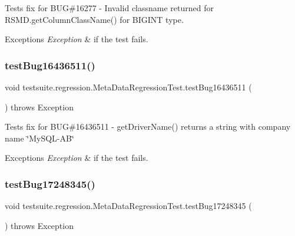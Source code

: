Tests fix for B\+UG\#16277 -\/ Invalid classname returned for R\+S\+M\+D.\+get\+Column\+Class\+Name() for B\+I\+G\+I\+NT type.


\begin{DoxyExceptions}{Exceptions}
{\em Exception} & if the test fails. \\
\hline
\end{DoxyExceptions}
\mbox{\label{classtestsuite_1_1regression_1_1_meta_data_regression_test_a1fd3d694ae818586b9e77cceb5bfbbb3}} 
\subsubsection{\texorpdfstring{test\+Bug16436511()}{testBug16436511()}}
{\footnotesize\ttfamily void testsuite.\+regression.\+Meta\+Data\+Regression\+Test.\+test\+Bug16436511 (\begin{DoxyParamCaption}{ }\end{DoxyParamCaption}) throws Exception}

Tests fix for B\+UG\#16436511 -\/ get\+Driver\+Name() returns a string with company name \char`\"{}\+My\+S\+Q\+L-\/\+A\+B\char`\"{}


\begin{DoxyExceptions}{Exceptions}
{\em Exception} & if the test fails. \\
\hline
\end{DoxyExceptions}
\mbox{\label{classtestsuite_1_1regression_1_1_meta_data_regression_test_a5eb8eb8d010b18e3193a85380d5483ba}} 
\subsubsection{\texorpdfstring{test\+Bug17248345()}{testBug17248345()}}
{\footnotesize\ttfamily void testsuite.\+regression.\+Meta\+Data\+Regression\+Test.\+test\+Bug17248345 (\begin{DoxyParamCaption}{ }\end{DoxyParamCaption}) throws Exception}

